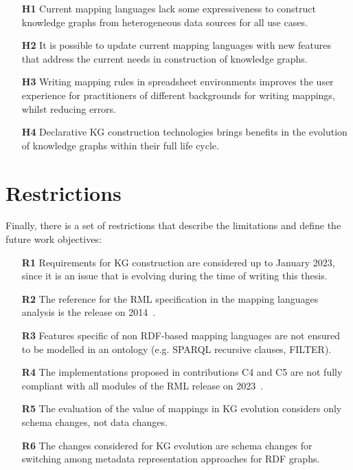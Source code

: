\begin{enumerate}
    \item[\textbf{H1}] Current mapping languages lack some expressiveness to construct knowledge graphs from heterogeneous data sources for all use cases.
    \item[\textbf{H2}] It is possible to update  current mapping languages with new features that address the current needs in construction of knowledge graphs.
    \item[\textbf{H3}] Writing mapping rules in spreadsheet environments improves the user experience for practitioners of different backgrounds for writing mappings, whilst reducing errors. 
    \item[\textbf{H4}] Declarative KG construction technologies brings benefits in the evolution of knowledge graphs within their full life cycle.
\end{enumerate}


\section{Restrictions}
\label{sec:chp3-restrictions}

Finally, there is a set of restrictions that describe the limitations and define the future work objectives:

\begin{enumerate}
    \item[\textbf{R1}] Requirements for KG construction are considered up to January 2023, since it is an issue that is evolving during the time of writing this thesis.
    \item[\textbf{R2}] The reference for the RML specification in the mapping languages analysis is the release on 2014~\parencite{Dimou2014rml}.
    \item[\textbf{R3}] Features specific of non RDF-based mapping languages are not ensured to be modelled in an ontology (e.g. SPARQL recursive clauses, FILTER).
    \item[\textbf{R4}] The implementations proposed in contributions C4 and C5 are not fully compliant with all modules of the RML release on 2023~\parencite{iglesias2023rml}. 
    \item[\textbf{R5}] The evaluation of the value of mappings in KG evolution considers only schema changes, not data changes.
    \item[\textbf{R6}] The changes considered for KG evolution are schema changes for switching among metadata representation approaches for RDF graphs.
\end{enumerate}


